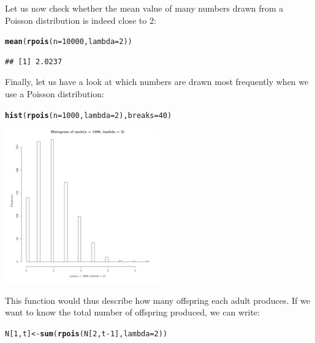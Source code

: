 \documentclass{article}\usepackage[]{graphicx}\usepackage[]{color}
\makeatletter
\newcommand{\hlnum}[1]{\textcolor[rgb]{0.686,0.059,0.569}{#1}}%
\newcommand{\hlopt}[1]{\textcolor[rgb]{0,0,0}{#1}}%
\newcommand{\hlstd}[1]{\textcolor[rgb]{0.345,0.345,0.345}{#1}}%
\newcommand{\hlkwb}[1]{\textcolor[rgb]{0.69,0.353,0.396}{#1}}%
\newcommand{\hlkwc}[1]{\textcolor[rgb]{0.333,0.667,0.333}{#1}}%
\newcommand{\hlkwd}[1]{\textcolor[rgb]{0.737,0.353,0.396}{\textbf{#1}}}%
\newenvironment{kframe}{%
 \def\at@end@of@kframe{}%
 \ifinner\ifhmode%
  \def\at@end@of@kframe{\end{minipage}}%
  \begin{minipage}{\columnwidth}%
 \fi\fi%
 \def\FrameCommand##1{\hskip\@totalleftmargin \hskip-\fboxsep
 \colorbox{shadecolor}{##1}\hskip-\fboxsep
     \hskip-\linewidth \hskip-\@totalleftmargin \hskip\columnwidth}%
 \MakeFramed {\advance\hsize-\width
   \@totalleftmargin\z@ \linewidth\hsize
   \@setminipage}}%
 {\par\unskip\endMakeFramed%
 \at@end@of@kframe}
\newenvironment{knitrout}{}{} %
\makeatother
\begin{document}
Let us now check whether the mean value of many numbers drawn from a Poisson distribution is indeed close to 2:
\begin{knitrout}
\color{fgcolor}\begin{kframe}
\begin{alltt}
\hlkwd{mean}\hlstd{(}\hlkwd{rpois}\hlstd{(}\hlkwc{n}\hlstd{=}\hlnum{10000}\hlstd{,}\hlkwc{lambda}\hlstd{=}\hlnum{2}\hlstd{))}
\end{alltt}
\begin{verbatim}
## [1] 2.0237
\end{verbatim}
\end{kframe}
\end{knitrout}
Finally, let us have a look at which numbers are drawn most frequently when we use a Poisson distribution:
\begin{knitrout}
\color{fgcolor}\begin{kframe}
\begin{alltt}
\hlkwd{hist}\hlstd{(}\hlkwd{rpois}\hlstd{(}\hlkwc{n}\hlstd{=}\hlnum{1000}\hlstd{,}\hlkwc{lambda}\hlstd{=}\hlnum{2}\hlstd{),}\hlkwc{breaks}\hlstd{=}\hlnum{40}\hlstd{)}
\end{alltt}
\end{kframe}

{\centering \includegraphics[width=0.5\textwidth]{figure/dice7-1} 

}



\end{knitrout}
This function would thus describe how many offspring each adult produces. If we want to know the total number of offspring produced, we can write:
\begin{knitrout}
\color{fgcolor}\begin{kframe}
\begin{alltt}
\hlstd{N[}\hlnum{1}\hlstd{,t]}\hlkwb{<-}\hlkwd{sum}\hlstd{(}\hlkwd{rpois}\hlstd{(N[}\hlnum{2}\hlstd{,t}\hlopt{-}\hlnum{1}\hlstd{],}\hlkwc{lambda}\hlstd{=}\hlnum{2}\hlstd{))}
\end{alltt}
\end{kframe}
\end{knitrout}
\end{document}
